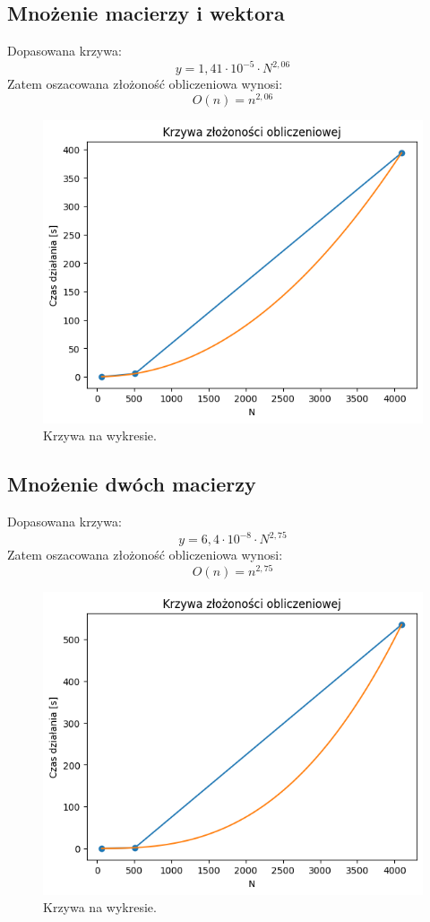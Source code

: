 \documentclass[11pt, leqno]{scrartcl}
\begin{document}
    \subsection{Mnożenie macierzy i wektora}
    Dopasowana krzywa:
    \[
        y=1,41 \cdot 10^{-5} \cdot N^{2,06}
    \]
    Zatem oszacowana złożoność obliczeniowa wynosi:
    \[
        O(n)=n^{2,06}
    \]
    \begin{figure}[H]
        \centering
        \includegraphics[width=0.7\linewidth]{matrix_vector_comp.png}
        \caption{Krzywa na wykresie.}
    \end{figure}

    \subsection{Mnożenie dwóch macierzy}
    Dopasowana krzywa:
    \[
        y=6,4 \cdot 10^{-8} \cdot N^{2,75}
    \]
    Zatem oszacowana złożoność obliczeniowa wynosi:
    \[
        O(n)=n^{2,75}
    \]
    \begin{figure}[H]
        \centering
        \includegraphics[width=0.7\linewidth]{matrix_matrix_comp.png}
        \caption{Krzywa na wykresie.}
    \end{figure}
\end{document}
